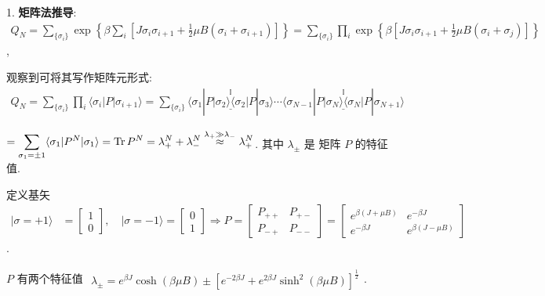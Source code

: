 \documentclass[../../main.tex]{subfiles}
\begin{document}
1. \textbf{矩阵法推导}: $\begin{aligned}
    Q_{N} = \sum_{\{\sigma_{i}\}}\exp\left\{
        \beta \sum_{i}\left[J\sigma_{i}\sigma_{i+1} + \frac{1}{2}\mu B(\sigma_{i}+\sigma_{i+1})\right]\right\} = \sum_{\{\sigma_{i}\}}\prod_{i}\exp\left\{\beta\left[
                J\sigma_{i}\sigma_{i+1}+\frac{1}{2}\mu B(\sigma_{i}+\sigma_{j})
                \right]\right\}
\end{aligned}$, 

观察到可将其写作矩阵元形式: $\begin{aligned}
    Q_{N} 
    = \sum_{\{\sigma_{i}\}}\prod_{i}\langle\sigma_{i}|P|\sigma_{i+1}\rangle 
    = \sum_{\{\sigma_{i}\}}\langle \sigma_{1}|P\stackrel{\mathbb{I}}{\underline{|\sigma_{2}\rangle\langle \sigma_{2}|}}P|\sigma_{3}\rangle\cdots\langle\sigma_{N-1}|P\stackrel{\mathbb{I}}{\underline{|\sigma_{N}\rangle\langle\sigma_{N}|}}P|\sigma_{N+1}\rangle
\end{aligned}$

$\begin{aligned}
     = \sum_{\sigma_{1}=\pm 1}\langle \sigma_{1}|P^{N}|\sigma_{1}\rangle 
     = \operatorname{Tr}{P^{N}}
     = \lambda_{+}^{N} + \lambda_{-}^{N}\stackrel{\lambda_{+}\gg \lambda_{-}}{\approx} \lambda_{+}^{N}
\end{aligned}$. 其中 $\lambda_{\pm}$ 是 矩阵 $P$ 的特征值.

定义基矢 $\begin{aligned}
    |\sigma=+1\rangle &= \begin{bmatrix}
        1\\0
    \end{bmatrix},\quad |\sigma=-1\rangle = \begin{bmatrix}
        0\\1
    \end{bmatrix}\Rightarrow 
    P = \begin{bmatrix}
        P_{++} & P_{+-}\\P_{-+} & P_{--}
    \end{bmatrix} = \begin{bmatrix}
        e^{\beta(J+\mu B)} & e^{-\beta J}\\
        e^{-\beta J} & e^{\beta(J-\mu B)}
    \end{bmatrix}
\end{aligned}$. 

$P$ 有两个特征值 $\begin{aligned}
    \lambda_{\pm}=e^{\beta J}\cosh{(\beta\mu B)}\pm [e^{-2\beta J}+e^{2\beta J}\sinh^{2}{(\beta\mu B)}]^{\frac{1}{2}}
\end{aligned}$. 
\end{document}
